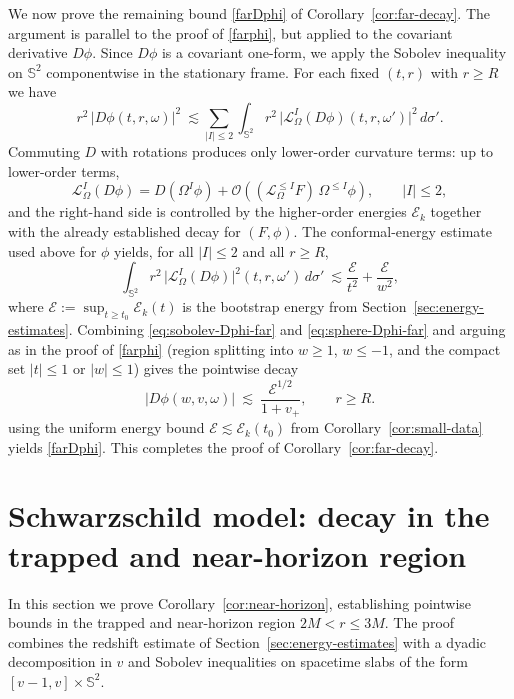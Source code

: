 \documentclass[11pt]{article}
\numberwithin{equation}{section}
\theoremstyle{plain}
\theoremstyle{definition}
\theoremstyle{remark}
\newcommand{\vplus}{v_{+}}
\begin{document}
We now prove the remaining bound \eqref{farDphi} of Corollary~\ref{cor:far-decay}.
The argument is parallel to the proof of \eqref{farphi}, but applied to the covariant derivative $D\phi$.
Since $D\phi$ is a covariant one-form, we apply the Sobolev inequality on $\mathbb S^{2}$ componentwise in the stationary frame.
For each fixed $(t,r)$ with $r\ge R$ we have
\begin{equation}\label{eq:sobolev-Dphi-far}
r^{2}\,|D\phi(t,r,\omega)|^{2}
\ \lesssim
\sum_{|I|\le 2}\int_{\mathbb S^{2}} r^{2}\,\bigl|\mathcal{L}_{\Omega}^{I}(D\phi)(t,r,\omega')\bigr|^{2}\,d\sigma'.
\end{equation}
Commuting $D$ with rotations produces only lower-order curvature terms:
up to lower-order terms,
\begin{equation}
\mathcal{L}_{\Omega}^{I}(D\phi)
=
D(\Omega^{I}\phi)
+
\mathcal{O}\!\left((\mathcal{L}_{\Omega}^{\le I}F)\,\Omega^{\le I}\phi\right),
\qquad |I|\le 2,
\end{equation}
and the right-hand side is controlled by the higher-order energies $\mathcal{E}_k$ together with the already established decay for $(F,\phi)$.
The conformal-energy estimate used above for $\phi$ yields, for all $|I|\le 2$ and all $r\ge R$,
\begin{equation}\label{eq:sphere-Dphi-far}
\int_{\mathbb S^{2}} r^{2}\,\bigl|\mathcal{L}_{\Omega}^{I}(D\phi)\bigr|^{2}(t,r,\omega')\,d\sigma'
\ \lesssim
\frac{\mathcal{E}}{t^{2}}+\frac{\mathcal{E}}{w^{2}},
\end{equation}
where $\mathcal{E}:=\sup_{t\ge t_0}\mathcal{E}_k(t)$ is the bootstrap energy from Section~\ref{sec:energy-estimates}.
Combining \eqref{eq:sobolev-Dphi-far} and \eqref{eq:sphere-Dphi-far} and arguing as in the proof of \eqref{farphi}
(region splitting into $w\ge 1$, $w\le -1$, and the compact set $|t|\le 1$ or $|w|\le 1$)
gives the pointwise decay
\begin{equation}
|D\phi(w,v,\omega)|\ \lesssim\ \frac{\mathcal{E}^{1/2}}{1+\vplus},
\qquad r\ge R.
\end{equation}
using the uniform energy bound $\mathcal{E}\lesssim \mathcal{E}_k(t_0)$ from Corollary~\ref{cor:small-data}
yields \eqref{farDphi}. This completes the proof of Corollary~\ref{cor:far-decay}.




\section{Schwarzschild model: decay in the trapped and near-horizon region}
\label{sec:decaynear}
In this section we prove Corollary~\ref{cor:near-horizon}, establishing pointwise bounds in the trapped and near-horizon region $2M<r\le 3M$. The proof combines the redshift estimate of Section~\ref{sec:energy-estimates} with a dyadic decomposition in $v$ and Sobolev inequalities on spacetime slabs of the form $[v-1,v]\times\mathbb S^{2}$.
\end{document}
